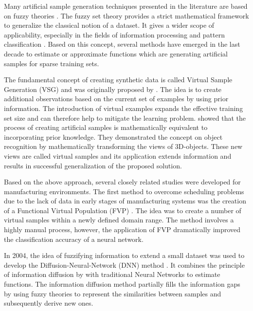 \documentclass[parskip=full]{scrartcl}
\begin{document}
Many artificial sample generation techniques presented in the literature are
based on fuzzy theories \cite{AbdulLateh.2017}. The fuzzy set theory provides a
strict mathematical framework to generalize the classical notion of a dataset.
It gives a wider scope of applicability, especially in the fields of information
processing and pattern classification \cite{Zimmermann.2010}. Based on this
concept, several methods have emerged in the last decade to estimate or
approximate functions which are generating artificial samples for sparse
training sets.

The fundamental concept of creating synthetic data is called Virtual Sample
Generation (VSG) and was originally proposed by \cite{Niyogi.1998}. The idea is
to create additional observations based on the current set of examples by using
prior information. The introduction of virtual examples expands the effective
training set size and can therefore help to mitigate the learning problem.
\cite{Niyogi.1998} showed that the process of creating artificial samples is
mathematically equivalent to incorporating prior knowledge. They demonstrated
the concept on object recognition by mathematically transforming the views of
3D-objects. These new views are called virtual samples and its application
extends information and results in successful generalization of the proposed
solution.

Based on the above approach, several closely related studies were developed for
manufacturing environments. The first method to overcome scheduling problems due
to the lack of data in early stages of manufacturing systems was the creation of
a Functional Virtual Population (FVP) \cite{Li.2003}. The idea was to create a
number of virtual samples within a newly defined domain range. The method
involves a highly manual process, however, the application of FVP dramatically
improved the classification accuracy of a neural network. 

In 2004, the idea of fuzzifying information to extend a small dataset was used
to develop the Diffusion-Neural-Network (DNN) method \cite{Huang.2004}. It
combines the principle of information diffusion by \cite{Huang.1997} with
traditional Neural Networks to estimate functions. The information diffusion
method partially fills the information gaps by using fuzzy theories to represent
the similarities between samples and subsequently derive new ones. 
\end{document}
